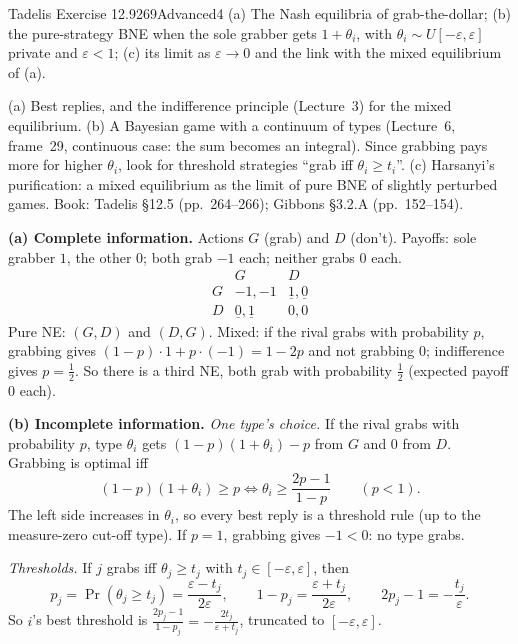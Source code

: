 \begin{exsol}{Tadelis Exercise 12.9}{269}{Advanced}{4}
\asked (a) The Nash equilibria of grab-the-dollar; (b) the pure-strategy BNE when the sole grabber
gets $1 + \theta_i$, with $\theta_i \sim U[-\varepsilon, \varepsilon]$ private and $\varepsilon < 1$;
(c) its limit as $\varepsilon \to 0$ and the link with the mixed equilibrium of (a).

\method (a) Best replies, and the indifference principle (Lecture~3) for the mixed equilibrium.
(b) A Bayesian game with a continuum of types (Lecture~6, frame~29, continuous case: the sum
becomes an integral). Since grabbing pays more for higher $\theta_i$, look for threshold strategies
``grab iff $\theta_i \ge t_i$''. (c) Harsanyi's purification: a mixed equilibrium as the limit of pure
BNE of slightly perturbed games. Book: Tadelis \S12.5 (pp.~264--266); Gibbons \S3.2.A (pp.~152--154).

\solution
\textbf{(a) Complete information.} Actions $G$ (grab) and $D$ (don't). Payoffs: sole grabber $1$, the
other $0$; both grab $-1$ each; neither grabs $0$ each.
\[
\begin{array}{c|cc}
 & G & D\\\hline
 G & -1,-1 & \underline{1},\underline{0}\\
 D & \underline{0},\underline{1} & 0,0
\end{array}
\]
Pure NE: $(G, D)$ and $(D, G)$. Mixed: if the rival grabs with probability $p$, grabbing gives
$(1-p)\cdot 1 + p\cdot(-1) = 1 - 2p$ and not grabbing $0$; indifference gives $p = \frac12$. So there is a
third NE, both grab with probability $\frac12$ (expected payoff $0$ each).

\textbf{(b) Incomplete information.} \emph{One type's choice.} If the rival grabs with probability $p$,
type $\theta_i$ gets $(1 - p)(1 + \theta_i) - p$ from $G$ and $0$ from $D$. Grabbing is optimal iff
\[
  (1-p)(1+\theta_i) \ge p \iff \theta_i \ge \frac{2p - 1}{1 - p} \qquad (p < 1).
\]
The left side increases in $\theta_i$, so every best reply is a threshold rule (up to the measure-zero
cut-off type). If $p = 1$, grabbing gives $-1 < 0$: no type grabs.

\emph{Thresholds.} If $j$ grabs iff $\theta_j \ge t_j$ with $t_j \in [-\varepsilon, \varepsilon]$, then
\[
  p_j = \Pr(\theta_j \ge t_j) = \frac{\varepsilon - t_j}{2\varepsilon}, \qquad
  1 - p_j = \frac{\varepsilon + t_j}{2\varepsilon}, \qquad 2p_j - 1 = -\frac{t_j}{\varepsilon}.
\]
So $i$'s best threshold is $\frac{2p_j - 1}{1 - p_j} = -\frac{2t_j}{\varepsilon + t_j}$, truncated to
$[-\varepsilon,\varepsilon]$.


\end{exsol}
